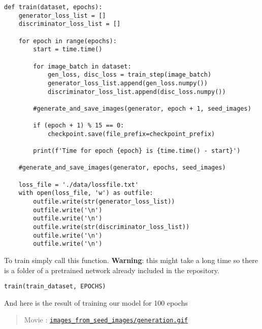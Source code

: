 \documentclass[%
oneside,                 %
final,                   %
10pt]{article}
\newenvironment{doconce:movie}{}{}
\newcounter{doconce:movie:counter}
\begin{document}
\begin{verbatim}
def train(dataset, epochs):
    generator_loss_list = []
    discriminator_loss_list = []

    for epoch in range(epochs):
        start = time.time()

        for image_batch in dataset:
            gen_loss, disc_loss = train_step(image_batch)
            generator_loss_list.append(gen_loss.numpy())
            discriminator_loss_list.append(disc_loss.numpy())

        #generate_and_save_images(generator, epoch + 1, seed_images)

        if (epoch + 1) % 15 == 0:
            checkpoint.save(file_prefix=checkpoint_prefix)

        print(f'Time for epoch {epoch} is {time.time() - start}')

    #generate_and_save_images(generator, epochs, seed_images)

    loss_file = './data/lossfile.txt'
    with open(loss_file, 'w') as outfile:
        outfile.write(str(generator_loss_list))
        outfile.write('\n')
        outfile.write('\n')
        outfile.write(str(discriminator_loss_list))
        outfile.write('\n')
        outfile.write('\n')

\end{verbatim}


To train simply call this function. \textbf{Warning}: this might take a long time so
there is a folder of a pretrained network already included in the repository.



\begin{verbatim}
train(train_dataset, EPOCHS)

\end{verbatim}


And here is the result of training our model for 100 epochs


\begin{doconce:movie}
\begin{quote}
Movie :  \href{run:images_from_seed_images/generation.gif}{\nolinkurl{images_from_seed_images/generation.gif}}
\end{quote}
\end{doconce:movie}
\end{document}
